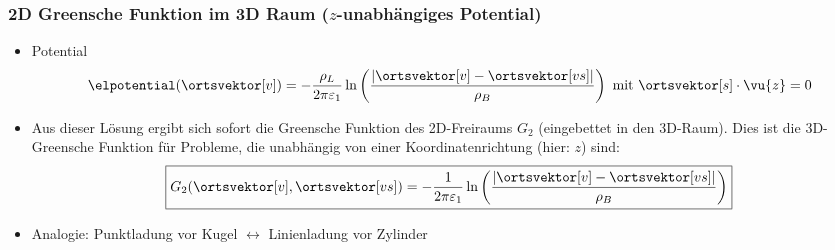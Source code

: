 \begin{frame}
  \frametitle{2D Greensche Funktion im 3D Raum ($z$-unabhängiges Potential)}
  \begin{itemize}[<+->]
  \item Potential
    \begin{equation*}
     \elpotential(\ortsvektor[v]) = -\frac{\rho_L}{2\pi\varepsilon_1} \ln\left(\frac{\left|\ortsvektor[v]-\ortsvektor[vs]\right|}{\rho_B} \right) \text{ mit } \ortsvektor[s]\cdot \vu{z} = 0
   \end{equation*}
 \item Aus dieser Lösung ergibt sich sofort die \alert{Greensche Funktion des 2D-Freiraums} $G_2$ (eingebettet in den 3D-Raum). Dies ist die 3D-Greensche Funktion für Probleme, die unabhängig von einer Koordinatenrichtung (hier: $z$) sind:
    \begin{equation*}
     \boxed{G_2(\ortsvektor[v], \ortsvektor[vs])= -\frac{1}{2\pi\varepsilon_1} \ln\left(\frac{\left|\ortsvektor[v]-\ortsvektor[vs]\right|}{\rho_B} \right) }
   \end{equation*}
   \item Analogie: Punktladung vor Kugel $\leftrightarrow$ Linienladung vor Zylinder
  \end{itemize}

  
  \end{frame}

